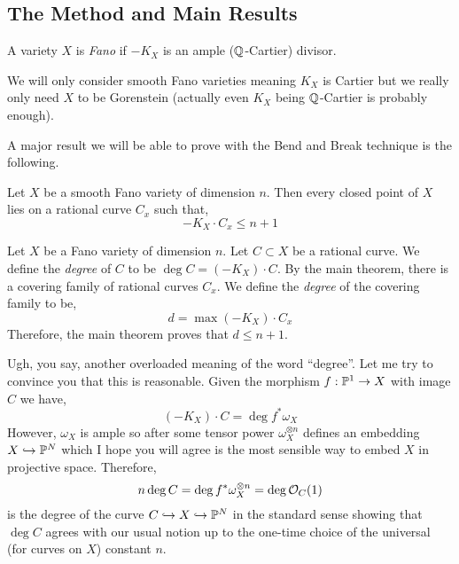 \documentclass[12pt]{article}
\begin{document}
\subsection{The Method and Main Results}

\begin{defn}
A variety $X$ is \textit{Fano} if $-K_X$ is an ample ($\Q$-Cartier) divisor. 
\end{defn}

\begin{rmk}
We will only consider smooth Fano varieties meaning $K_X$ is Cartier but we really only need $X$ to be Gorenstein (actually even $K_X$ being $\Q$-Cartier is probably enough).
\end{rmk}

\begin{rmk}
A major result we will be able to prove with the Bend and Break technique is the following.
\end{rmk}

\begin{thm}
Let $X$ be a smooth Fano variety of dimension $n$. Then every closed point of $X$ lies on a rational curve $C_x$ such that,
\[ - K_X \cdot C_x \le n + 1 \]
\end{thm}

\begin{defn}
Let $X$ be a Fano variety of dimension $n$. Let $C \subset X$ be a rational curve. We define the \textit{degree} of $C$ to be $\deg{C} = (-K_X) \cdot C$. By the main theorem, there is a covering family of rational curves $C_x$. We define the \textit{degree} of the covering family to be,
\[ d = \max{(-K_X) \cdot C_x} \]
Therefore, the main theorem proves that $d \le n + 1$.
\end{defn}

\begin{rmk}
Ugh, you say, another overloaded meaning of the word ``degree''. Let me try to convince you that this is reasonable. Given the morphism $f : \P^1 \to X$ with image $C$ we have,
\[ (-K_X) \cdot C = \deg{f^* \omega_X} \]
 However, $\omega_X$ is ample so after some tensor power $\omega_X^{\otimes n}$ defines an embedding $X \embed \P^N$ which I hope you will agree is the most sensible way to embed $X$ in projective space. Therefore, 
\[ n \deg{C} = \deg{f^* \omega_X^{\otimes n}} = \deg{\struct{C}(1)} \]
is the degree of the curve $C \embed X \embed \P^N$ in the standard sense showing that $\deg{C}$ agrees with our usual notion up to the one-time choice of the universal (for curves on $X$) constant $n$.
\end{rmk}
\end{document}
